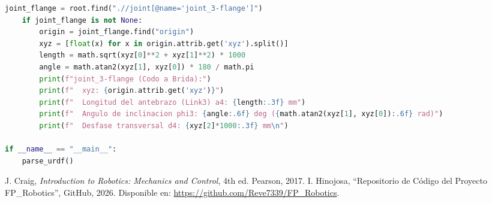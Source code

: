 \documentclass[conference,a4paper]{IEEEtran}
\begin{document}
\begin{lstlisting}[language=Python,caption={\small Script parser XML para extraer dimensiones y ángulos del archivo URDF/Xacro (get\_gazebo\_distances.py).},label={lst:get_gz_dist}]
    joint_flange = root.find(".//joint[@name='joint_3-flange']")
    if joint_flange is not None:
        origin = joint_flange.find("origin")
        xyz = [float(x) for x in origin.attrib.get('xyz').split()]
        length = math.sqrt(xyz[0]**2 + xyz[1]**2) * 1000
        angle = math.atan2(xyz[1], xyz[0]) * 180 / math.pi
        print(f"joint_3-flange (Codo a Brida):")
        print(f"  xyz: {origin.attrib.get('xyz')}")
        print(f"  Longitud del antebrazo (Link3) a4: {length:.3f} mm")
        print(f"  Angulo de inclinacion phi3: {angle:.6f} deg ({math.atan2(xyz[1], xyz[0]):.6f} rad)")
        print(f"  Desfase transversal d4: {xyz[2]*1000:.3f} mm\n")

if __name__ == "__main__":
    parse_urdf()
\end{lstlisting}
\begin{thebibliography}{00}
 J. Craig, \textit{Introduction to Robotics: Mechanics and Control}, 4th ed. Pearson, 2017.
 I. Hinojosa, ``Repositorio de Código del Proyecto FP\_Robotics'', GitHub, 2026. Disponible en: \url{https://github.com/Reve7339/FP_Robotics}.
\end{thebibliography}
\end{document}
